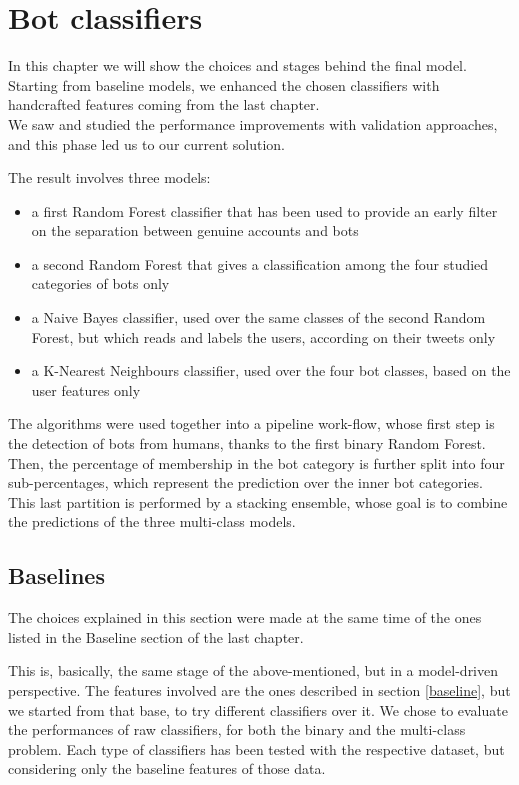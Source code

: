 \chapter{Bot classifiers}
\label{capitolo5}
\thispagestyle{empty}

In this chapter we will show the choices and stages behind the final model.
Starting from baseline models, we enhanced the chosen classifiers with handcrafted features coming from the last chapter.\\
We saw and studied the performance improvements with validation approaches, and this phase led us to our current solution.

The result involves three models:
\begin{itemize}
	\item[\PencilRight] a first Random Forest classifier that has been used to provide an early filter on the separation between genuine accounts and bots
	\item[\PencilRight] a second Random Forest that gives a classification among the four studied categories of bots only
	\item[\PencilRight] a Naive Bayes classifier, used over the same classes of the second Random Forest, but which reads and labels the users, according on their tweets only
	\item[\PencilRight] a K-Nearest Neighbours classifier, used over the four bot classes, based on the user features only
\end{itemize}
The algorithms were used together into a pipeline work-flow, whose first step is the detection of bots from humans, thanks to the first binary Random Forest.
Then, the percentage of membership in the bot category is further split into four sub-percentages, which represent the prediction over the inner bot categories.
This last partition is performed by a stacking ensemble, whose goal is to combine the predictions of the three multi-class models.


\section{Baselines}
The choices explained in this section were made at the same time of the ones listed in the Baseline section of the last chapter.

This is, basically, the same stage of the above-mentioned, but in a model-driven perspective.
The features involved are the ones described in section \ref{baseline}, but we started from that base, to try different classifiers over it.
We chose to evaluate the performances of raw classifiers, for both the binary and the multi-class problem.
Each type of classifiers has been tested with the respective dataset, but considering only the baseline features of those data.

